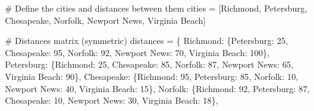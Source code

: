 \documentclass[
  letterpaper,
  DIV=11,
  numbers=noendperiod]{scrreprt}
\newenvironment{Shaded}{\begin{snugshade}}{\end{snugshade}}
\newcommand{\CommentTok}[1]{\textcolor[rgb]{0.37,0.37,0.37}{#1}}
\newcommand{\DecValTok}[1]{\textcolor[rgb]{0.68,0.00,0.00}{#1}}
\newcommand{\NormalTok}[1]{\textcolor[rgb]{0.00,0.23,0.31}{#1}}
\newcommand{\OperatorTok}[1]{\textcolor[rgb]{0.37,0.37,0.37}{#1}}
\newcommand{\StringTok}[1]{\textcolor[rgb]{0.13,0.47,0.30}{#1}}
\begin{document}
\begin{Shaded}
\begin{Highlighting}[]
\CommentTok{\# Define the cities and distances between them}
\NormalTok{cities }\OperatorTok{=}\NormalTok{ [}\StringTok{\textquotesingle{}Richmond\textquotesingle{}}\NormalTok{, }\StringTok{\textquotesingle{}Petersburg\textquotesingle{}}\NormalTok{, }\StringTok{\textquotesingle{}Chesapeake\textquotesingle{}}\NormalTok{, }\StringTok{\textquotesingle{}Norfolk\textquotesingle{}}\NormalTok{, }\StringTok{\textquotesingle{}Newport News\textquotesingle{}}\NormalTok{, }\StringTok{\textquotesingle{}Virginia Beach\textquotesingle{}}\NormalTok{]}

\CommentTok{\# Distances matrix (symmetric)}
\NormalTok{distances }\OperatorTok{=}\NormalTok{ \{}
    \StringTok{\textquotesingle{}Richmond\textquotesingle{}}\NormalTok{: \{}\StringTok{\textquotesingle{}Petersburg\textquotesingle{}}\NormalTok{: }\DecValTok{25}\NormalTok{, }\StringTok{\textquotesingle{}Chesapeake\textquotesingle{}}\NormalTok{: }\DecValTok{95}\NormalTok{, }\StringTok{\textquotesingle{}Norfolk\textquotesingle{}}\NormalTok{: }\DecValTok{92}\NormalTok{, }\StringTok{\textquotesingle{}Newport News\textquotesingle{}}\NormalTok{: }\DecValTok{70}\NormalTok{, }\StringTok{\textquotesingle{}Virginia Beach\textquotesingle{}}\NormalTok{: }\DecValTok{100}\NormalTok{\},}
    \StringTok{\textquotesingle{}Petersburg\textquotesingle{}}\NormalTok{: \{}\StringTok{\textquotesingle{}Richmond\textquotesingle{}}\NormalTok{: }\DecValTok{25}\NormalTok{, }\StringTok{\textquotesingle{}Chesapeake\textquotesingle{}}\NormalTok{: }\DecValTok{85}\NormalTok{, }\StringTok{\textquotesingle{}Norfolk\textquotesingle{}}\NormalTok{: }\DecValTok{87}\NormalTok{, }\StringTok{\textquotesingle{}Newport News\textquotesingle{}}\NormalTok{: }\DecValTok{65}\NormalTok{, }\StringTok{\textquotesingle{}Virginia Beach\textquotesingle{}}\NormalTok{: }\DecValTok{90}\NormalTok{\},}
    \StringTok{\textquotesingle{}Chesapeake\textquotesingle{}}\NormalTok{: \{}\StringTok{\textquotesingle{}Richmond\textquotesingle{}}\NormalTok{: }\DecValTok{95}\NormalTok{, }\StringTok{\textquotesingle{}Petersburg\textquotesingle{}}\NormalTok{: }\DecValTok{85}\NormalTok{, }\StringTok{\textquotesingle{}Norfolk\textquotesingle{}}\NormalTok{: }\DecValTok{10}\NormalTok{, }\StringTok{\textquotesingle{}Newport News\textquotesingle{}}\NormalTok{: }\DecValTok{40}\NormalTok{, }\StringTok{\textquotesingle{}Virginia Beach\textquotesingle{}}\NormalTok{: }\DecValTok{15}\NormalTok{\},}
    \StringTok{\textquotesingle{}Norfolk\textquotesingle{}}\NormalTok{: \{}\StringTok{\textquotesingle{}Richmond\textquotesingle{}}\NormalTok{: }\DecValTok{92}\NormalTok{, }\StringTok{\textquotesingle{}Petersburg\textquotesingle{}}\NormalTok{: }\DecValTok{87}\NormalTok{, }\StringTok{\textquotesingle{}Chesapeake\textquotesingle{}}\NormalTok{: }\DecValTok{10}\NormalTok{, }\StringTok{\textquotesingle{}Newport News\textquotesingle{}}\NormalTok{: }\DecValTok{30}\NormalTok{, }\StringTok{\textquotesingle{}Virginia Beach\textquotesingle{}}\NormalTok{: }\DecValTok{18}\NormalTok{\},}

\end{Highlighting}
\end{Shaded}
\end{document}
